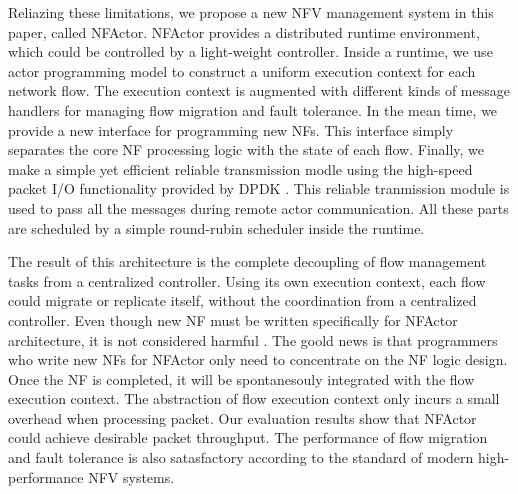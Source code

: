 
Reliazing these limitations, we propose a new NFV management system in this paper, called NFActor. NFActor provides a distributed runtime environment, which could be controlled by a light-weight controller. Inside a runtime, we use actor programming model \cite{actor-wiki} to construct a uniform execution context for each network flow. The execution context is augmented with different kinds of message handlers for managing flow migration and fault tolerance. In the mean time, we provide a new interface for programming new NFs. This interface simply separates the core NF processing logic with the state of each flow. Finally, we make a simple yet efficient reliable transmission modle using the high-speed packet I/O functionality provided by DPDK \cite{dpdk}. This reliable tranmission module is used to pass all the messages during remote actor communication. All these parts are scheduled by a simple round-rubin scheduler inside the runtime.


The result of this architecture is the complete decoupling of flow management tasks from a centralized controller. Using its own execution context, each flow could migrate or replicate itself, without the coordination from a centralized controller. Even though new NF must be written specifically for NFActor architecture, it is not considered harmful \cite{199352}. The goold news is that programmers who write new NFs for NFActor only need to concentrate on the NF logic design. Once the NF is completed, it will be spontanesouly integrated with the flow execution context. The abstraction of flow execution context only incurs a small overhead when processing packet. Our evaluation results show that NFActor could achieve desirable packet throughput. The performance of flow migration and fault tolerance is also satasfactory according to the standard of modern high-performance NFV systems.  

